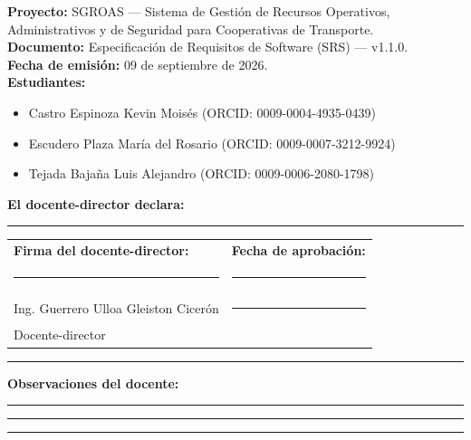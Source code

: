 \documentclass[12pt,a4paper]{article}
\begin{document}
\vspace{1cm}
\noindent\textbf{Proyecto:} SGROAS --- Sistema de Gestión de Recursos Operativos, Administrativos y de Seguridad para Cooperativas de Transporte.\\[0.3cm]
\noindent\textbf{Documento:} Especificación de Requisitos de Software (SRS) --- v1.1.0.\\[0.3cm]
\noindent\textbf{Fecha de emisión:} 09 de septiembre de 2026.\\[0.3cm]
\noindent\textbf{Estudiantes:}
\begin{itemize}
  \item Castro Espinoza Kevin Moisés (ORCID: 0009-0004-4935-0439)
  \item Escudero Plaza María del Rosario (ORCID: 0009-0007-3212-9924)
  \item Tejada Bajaña Luis Alejandro (ORCID: 0009-0006-2080-1798)
\end{itemize}

\vspace{1cm}
\noindent\textbf{El docente-director declara:}

\vspace{0.5cm}
\noindent\rule{\textwidth}{0.4pt}
\vspace{0.5cm}

\noindent\begin{tabular}{@{}p{8cm}p{8cm}@{}}
\textbf{Firma del docente-director:} & \textbf{Fecha de aprobación:} \\[2cm]
\rule{6cm}{0.4pt} & \rule{4cm}{0.4pt} \\[0.3cm]
Ing. Guerrero Ulloa Gleiston Cicerón & \rule{4cm}{0.4pt} \\[0.3cm]
Docente-director & \\
\end{tabular}

\vspace{1cm}
\noindent\rule{\textwidth}{0.4pt}
\vspace{0.5cm}
\noindent\textbf{Observaciones del docente:}
\vspace{2cm}
\noindent\rule{\textwidth}{0.4pt}
\vspace{2cm}
\noindent\rule{\textwidth}{0.4pt}
\vspace{2cm}
\noindent\rule{\textwidth}{0.4pt}

\newpage
\printbibliography[title={Referencias}]
\end{document}
